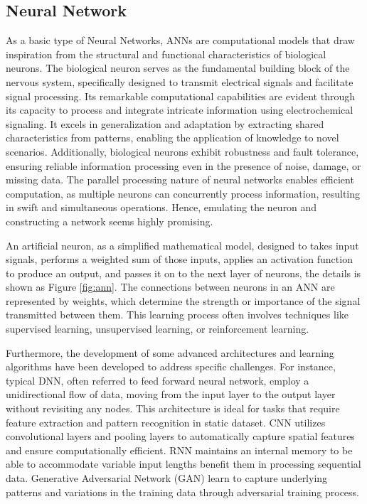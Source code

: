 \subsection{Neural Network}
As a basic type of Neural Networks, \ac{ANN}s are computational models that draw inspiration from the structural and functional characteristics of biological neurons\cite{zhang2000Introduction}. The biological neuron serves as the fundamental building block of the nervous system, specifically designed to transmit electrical signals and facilitate signal processing. Its remarkable computational capabilities are evident through its capacity to process and integrate intricate information using electrochemical signaling\cite{zou2009Overview}. It excels in generalization and adaptation by extracting shared characteristics from patterns, enabling the application of knowledge to novel scenarios. Additionally, biological neurons exhibit robustness and fault tolerance\cite{chen2023ElectrochemicalMemristorBased}, ensuring reliable information processing even in the presence of noise, damage, or missing data. The parallel processing nature of neural networks enables efficient computation\cite{hopfield1982Neural}, as multiple neurons can concurrently process information, resulting in swift and simultaneous operations. Hence, emulating the neuron and constructing a network seems highly promising. 

An artificial neuron, as a simplified mathematical model, designed to takes input signals, performs a weighted sum of those inputs, applies an activation function to produce an output, and passes it on to the next layer of neurons, the details is shown as Figure \ref{fig:ann}. The connections between neurons in an ANN are represented by weights, which determine the strength or importance of the signal transmitted between them. This learning process often involves techniques like supervised learning\cite{ebert2018Robustness}, unsupervised learning\cite{koenig1996Unsupervised}, or reinforcement learning\cite{ji2022Synthesizing}. 


Furthermore, the development of some advanced architectures and learning algorithms have been developed to address specific challenges. For instance, typical \ac{DNN}, often referred to feed forward neural network, employ a unidirectional flow of data, moving from the input layer to the output layer without revisiting any nodes. This architecture is ideal for tasks that require feature extraction and pattern recognition in static dataset\cite{hwangbo2019Learning}. \ac{CNN} utilizes convolutional layers and pooling layers to automatically capture spatial features and ensure computationally efficient\cite{albawi2017Understanding}. \ac{RNN} maintains an internal memory to be able to accommodate variable input lengths benefit them in processing sequential data\cite{lipton2015Critical}. Generative Adversarial Network (GAN) learn to capture underlying patterns and variations in the training data through adversarial training process\cite{song2023Energy}.   

